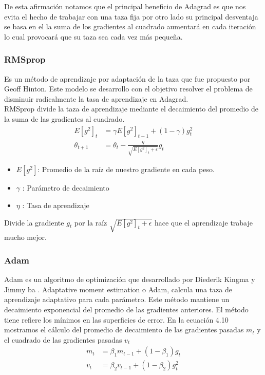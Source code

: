 De esta afirmación notamos que el principal beneficio de Adagrad es que nos evita el hecho de trabajar con una taza fija por otro lado su principal desventaja se basa en el la suma de los gradientes al cuadrado aumentará en cada iteración lo cual provocará que su taza sea cada vez más pequeña.


\subsubsection{RMSprop}
Es un método de aprendizaje por adaptación de la taza que fue propuesto por Geoff Hinton.
Este modelo se desarrollo con el objetivo resolver el problema de disminuir radicalmente la tasa de aprendizaje en Adagrad.\\ RMSprop divide la taza de aprendizaje mediante el decaimiento del promedio de la suma de las gradientes al cuadrado.
\begin{equation}
\label{RMS}
\begin{aligned}
E[g^2]_{t} &= \gamma E[g^2]_{t-1} + (1-\gamma)g^{2}_{t}\\
\theta_{t+1} &= \theta_{t} - \frac{\eta}{\sqrt{E[g^2]_{t} +\epsilon }} g_{t}
\end{aligned}
\end{equation}
\begin{itemize}
	\item $E[g^2]$: Promedio de la raíz de nuestro gradiente en cada peso.
	\item $\gamma$  : Parámetro de decaimiento
	\item $\eta$    : Tasa de aprendizaje
\end{itemize}
Divide la gradiente $g_{t}$ por la raíz $\sqrt{E[g^2]_{t} +\epsilon}$ hace que el aprendizaje trabaje mucho mejor.
\subsubsection{Adam	}
Adam es un algoritmo de optimización que desarrollado por Diederik Kingma y Jimmy ba\cite{ADAM} .
Adaptative moment estimation  o Adam, calcula una taza de aprendizaje adaptativo para cada parámetro. Este método mantiene un decaimiento exponencial del promedio de las gradientes anteriores. El método tiene refiere los mínimos en las superficies de error.
 En la ecuación 4.10 mostramos el cálculo del promedio de decaimiento de las gradientes pasadas $m_{t}$ y el cuadrado de las gradientes pasadas $v_{t}$
\begin{equation}
\label{adam1}
\begin{aligned}
m_{t} &= \beta_{1} m_{t-1} +(1-\beta_{1})g_{t} \\
v_{t} &= \beta_{2} v_{t-1} +(1-\beta_{2})g_{t}^2
\end{aligned}
\end{equation}

